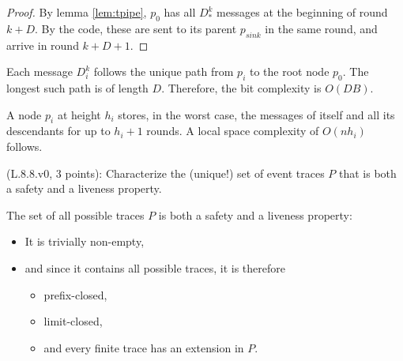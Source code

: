 \begin{proof}
By lemma \ref{lem:tpipe}, $p_0$ has all $D_*^k$ messages at the beginning
of round $k + D$. By the code, these are sent to its parent $p_{sink}$ in the same
round, and arrive in round $k + D + 1$.
\end{proof}

Each message $D_i^k$ follows the unique path from $p_i$ to the root node $p_0$.
The longest such path is of length $D$. Therefore, the bit complexity is $O(DB)$.

A node $p_i$ at height $h_i$ stores, in the worst case, the messages of itself and
all its descendants for up to $h_i + 1$ rounds. A local space complexity of
$O(nh_i)$ follows.


\begin{Exc}{(L.8.8.v0, 3 points):}
Characterize the (unique!) set of event traces $P$ that is both
a safety and a liveness property.
\end{Exc}


The set of all possible traces $P$ is both a safety and a liveness property:

\begin{itemize}
\item It is trivially non-empty,
\item and since it contains all possible traces, it is therefore
    \begin{itemize}
    \item prefix-closed,
    \item limit-closed,
    \item and every finite trace has an extension in $P$.
    \end{itemize}
\end{itemize}


